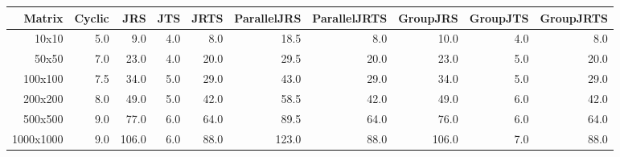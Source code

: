 \begin{tabular}{rrrrrrrrrr}
\toprule
Matrix & Cyclic & JRS & JTS & JRTS & ParallelJRS & ParallelJRTS & GroupJRS & GroupJTS & GroupJRTS \\
\midrule
10x10 & 5.0 & 9.0 & 4.0 & 8.0 & 18.5 & 8.0 & 10.0 & 4.0 & 8.0 \\
50x50 & 7.0 & 23.0 & 4.0 & 20.0 & 29.5 & 20.0 & 23.0 & 5.0 & 20.0 \\
100x100 & 7.5 & 34.0 & 5.0 & 29.0 & 43.0 & 29.0 & 34.0 & 5.0 & 29.0 \\
200x200 & 8.0 & 49.0 & 5.0 & 42.0 & 58.5 & 42.0 & 49.0 & 6.0 & 42.0 \\
500x500 & 9.0 & 77.0 & 6.0 & 64.0 & 89.5 & 64.0 & 76.0 & 6.0 & 64.0 \\
1000x1000 & 9.0 & 106.0 & 6.0 & 88.0 & 123.0 & 88.0 & 106.0 & 7.0 & 88.0 \\
\bottomrule
\end{tabular}
